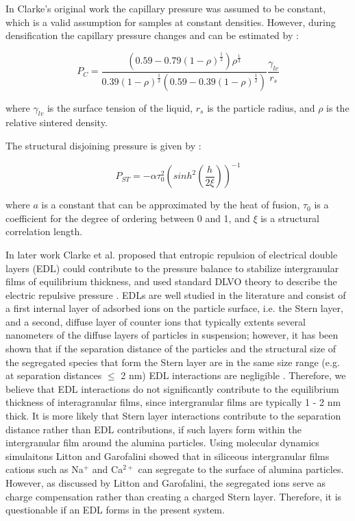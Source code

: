 In Clarke's original work the capillary pressure was assumed to be constant, which is a valid assumption for samples at constant densities. However, during densification the capillary pressure changes and can be estimated by \cite{Kwon1991}:

\begin{equation}
\label{Ch4-eq: eq6}
P_{C} = \frac{\left( 0.59-0.79 \left(1-\rho \right)^{\frac{1}{2}} \right) \rho^{\frac{1}{3}}}{0.39 \left(1-\rho \right)^{\frac{1}{2}} \left(0.59-0.39 \left(1-\rho \right)^{\frac{1}{2}} \right)} \frac{\gamma_{lv}}{r_{s}}
\end{equation}

\noindent where $\gamma_{lv}$ is the surface tension of the liquid, $r_{s}$ is the particle radius, and $\rho$ is the relative sintered density.

The structural disjoining pressure is given by \cite{Clarke1987}:

\begin{equation}
\label{Ch4-eq: eq7}
P_{ST} = - \alpha \tau_{0}^{2} \left( sinh^{2} \left( \frac{h}{2 \xi} \right) \right)^{-1}
\end{equation}

\noindent where $a$ is a constant that can be approximated by the heat of fusion, $\tau_{0}$ is a coefficient for the degree of ordering between 0 and 1, and $\xi$ is a structural correlation length.

In later work Clarke et al. proposed that entropic repulsion of electrical double layers (EDL) could contribute to the pressure balance to stabilize intergranular films of equilibrium thickness, and used standard DLVO theory to describe the electric repulsive pressure \cite{Clarke1993}. EDLs are well studied in the literature \cite{Israelachvili2011} and consist of a first internal layer of adsorbed ions on the particle surface, i.e. the Stern layer, and a second, diffuse layer of counter ions that typically extents several nanometers of the diffuse layers of particles in suspension; however, it has been shown that if the separation distance of the particles and the structural size of the segregated species that form the Stern layer are in the same size range (e.g. at separation distances $\leq$ 2 nm) EDL interactions are negligible \cite{Israelachvili2011,Claesson1984}. Therefore, we believe that EDL interactions do not significantly contribute to the equilibrium thickness of interagranular films, since intergranular films are typically 1 - 2 nm thick. It is more likely that Stern layer interactions contribute to the separation distance rather than EDL contributions, if such layers form within the intergranular film around the alumina particles. Using molecular dynamics simulaitons Litton and Garofalini \cite{Zhang2005,Litton1999,Litton2000} showed that in siliceous intergranular films cations such as Na$^{+}$ and Ca$^{2+}$ can segregate to the surface of alumina particles. However, as discussed by Litton and Garofalini, the segregated ions serve as charge compensation rather than creating a charged Stern layer. Therefore, it is questionable if an EDL forms in the present system. 

